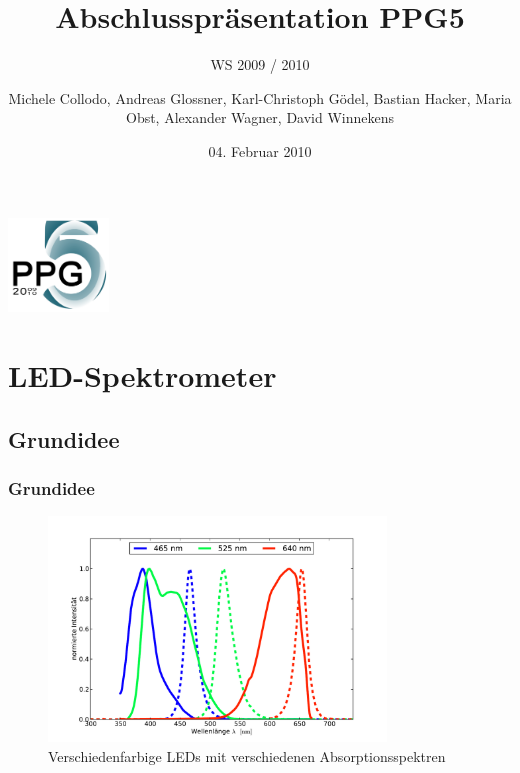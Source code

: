 \documentclass[10pt]{beamer}
\title[Abschlusspr\"asentation]{Abschlusspr\"asentation PPG5}
\subtitle{WS 2009 / 2010}
\author[PPG5]{Michele Collodo, Andreas Glossner, Karl-Christoph G\"odel, Bastian Hacker, Maria Obst, Alexander Wagner, David Winnekens}
\date{04. Februar 2010}
\begin{document}
\frame
{
\hfill
\includegraphics[width=0.20\textwidth]{images/ppg5logocrop.pdf}
\titlepage
}

\section{LED-Spektrometer}
\subsection[]{Grundidee}
\frame
{
\frametitle{Grundidee}
\begin{figure}
\begin{center}
\includegraphics[width=0.8\textwidth]{./images/absorp-emit.pdf}
\caption{Verschiedenfarbige LEDs mit verschiedenen Absorptionsspektren}
\end{center}
\end{figure}
}
\end{document}
